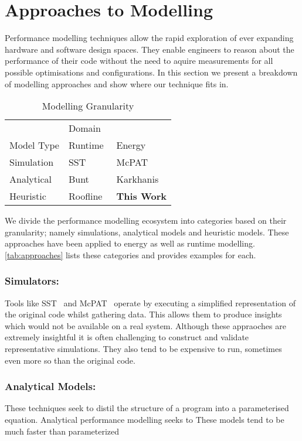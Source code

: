 \section{Approaches to Modelling}
\label{sec:related}
Performance modelling techniques allow the rapid exploration of ever expanding hardware and software design spaces.
They enable engineers to reason about the performance of their code without the need to aquire measurements for all possible optimisations and configurations.
In this section we present a breakdown of modelling approaches and show where our technique fits in.

\begin{table}
  \centering
  \caption{Modelling Granularity}
  \setlength{\tabcolsep}{10pt}
  \begin{tabular}{lll}
  \toprule
    & \multicolumn{2}{l}{Domain}\\ \cmidrule(){2-3}
  Model Type  & Runtime & Energy \\
    \midrule
  Simulation & SST~\cite{rodrigues:2011aa} & McPAT~\cite{li:2009aa}  \\
  Analytical & Bunt~\cite{bunt:2013aa} & Karkhanis~\cite{karkhanis:2007aa} \\
  Heuristic & Roofline~\cite{williams:2009aa} & \textbf{This Work} \\
  \bottomrule
  \end{tabular}
  \label{tab:approaches}
\end{table}

We divide the performance modelling ecosystem into categories based on their granularity; namely simulations, analytical models and heuristic models.
These approaches have been applied to energy as well as runtime modelling.
\autoref{tab:approaches} lists these categories and provides examples for each. 

\subsubsection{Simulators:} 
Tools like SST~\cite{rodrigues:2011aa} and McPAT~\cite{li:2009aa} operate by executing a simplified representation of the original code whilst gathering data.
This allows them to produce insights which would not be available on a real system.
Although these appraoches are extremely insightful it is often challenging to construct and validate representative simulations.
They also tend to be expensive to run, sometimes even more so than the original code.


\subsubsection{Analytical Models:}  These techniques seek to distil the structure of a program into a parameterised equation.
Analytical performance modelling seeks to 
These models tend to be much faster than 
parameterized 
